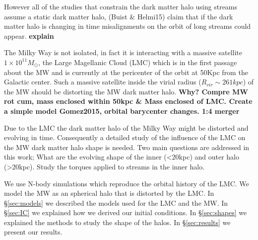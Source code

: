 However all of the studies that constrain the dark matter halo using streams
assume a static dark matter halo, (Buist \& Helmi15) claim that if the dark matter
halo is changing in time misalignments on the orbit of long streams could appear.
\textbf{explain}

The Milky Way is not isolated, in fact it is interacting with a 
massive satellite ~$1\times10^{11}M_{\odot}$, the Large Magellanic Cloud (LMC)
which is in the first passage about the MW and is currently at the pericenter
of the orbit at 50Kpc from the Galactic center. Such a massive satellite inside the virial 
radius ($R_{vir}\sim 261kpc$) of the MW should be distorting the MW dark matter
halo. \textbf{Why? Compre MW rot cum, mass enclosed within 50kpc & Mass
enclosed of LMC. Create a simple model Gomez2015, orbital barycenter
changes. 1:4 merger}


Due to the LMC the dark matter halo of the Milky Way might be
distorted and evolving in time. Consequently a detailed study of the
influence of the LMC on the MW dark matter halo shape is needed. Two
main questions are addressed in this work; What are the evolving shape of the inner
(<20kpc) and outer halo (>20kpc). Study the torques applied to streams in the inner halo.

We use N-body simulations which reproduce the orbital history of the
LMC. We model the MW as an spherical halo that is distorted by the LMC.
In \S\ref{sec:models} we described the models used for the LMC and
the MW. In \S\ref{sec:IC} we explained how we derived our initial
conditions. In \S\ref{sec:shapes} we explained the methods to study
the shape of the halos. In \S\ref{sec:results} we present our
results.
